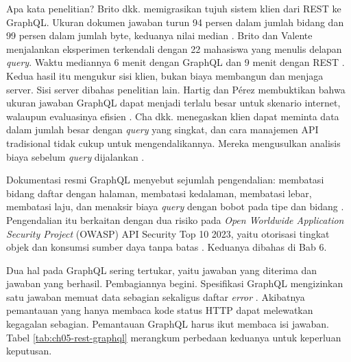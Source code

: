 Apa kata penelitian? Brito dkk. memigrasikan tujuh sistem klien dari REST ke GraphQL. Ukuran dokumen jawaban turun 94 persen
dalam jumlah bidang dan 99 persen dalam jumlah byte, keduanya nilai median \cite{c05-brito2019migrating}. Brito dan Valente
menjalankan eksperimen terkendali dengan 22 mahasiswa yang menulis delapan \textit{query}. Waktu mediannya 6 menit dengan
GraphQL dan 9 menit dengan REST \cite{c05-brito2020experiment}. Kedua hasil itu mengukur sisi klien, bukan biaya membangun
dan menjaga server. Sisi server dibahas penelitian lain. Hartig dan P{\'e}rez membuktikan bahwa ukuran jawaban GraphQL dapat
menjadi terlalu besar untuk skenario internet, walaupun evaluasinya efisien \cite{c05-hartig2018graphql}. Cha dkk.
menegaskan klien dapat meminta data dalam jumlah besar dengan \textit{query} yang singkat, dan cara manajemen API tradisional
tidak cukup untuk mengendalikannya. Mereka mengusulkan analisis biaya sebelum \textit{query} dijalankan
\cite{c05-cha2020cost}.

Dokumentasi resmi GraphQL menyebut sejumlah pengendalian: membatasi bidang daftar dengan halaman, membatasi kedalaman,
membatasi lebar, membatasi laju, dan menaksir biaya \textit{query} dengan bobot pada tipe dan bidang
\cite{c05-graphql-security}. Pengendalian itu berkaitan dengan dua risiko pada \textit{Open Worldwide Application
Security Project} (OWASP) API Security Top 10 2023, yaitu otorisasi tingkat objek dan konsumsi sumber daya tanpa batas
\cite{owasp-api2023}. Keduanya dibahas di Bab 6.

Dua hal pada GraphQL sering tertukar, yaitu jawaban yang diterima dan jawaban yang berhasil. Pembagiannya begini. Spesifikasi
GraphQL mengizinkan satu jawaban memuat data sebagian sekaligus daftar \textit{error} \cite{c05-graphql-spec}. Akibatnya
pemantauan yang hanya membaca kode status HTTP dapat melewatkan kegagalan sebagian. Pemantauan GraphQL harus ikut membaca isi
jawaban. Tabel \ref{tab:ch05-rest-graphql} merangkum perbedaan keduanya untuk keperluan keputusan.

